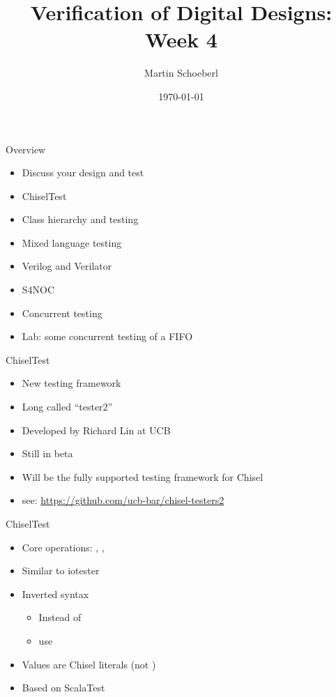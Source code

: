 

\newif\ifbook


\title{Verification of Digital Designs: Week 4}
\author{Martin Schoeberl}
\date{\today}



\begin{frame}
\titlepage
\end{frame}

\begin{frame}[fragile]{Overview}
\begin{itemize}
\item Discuss your design and test
\item ChiselTest
\item Class hierarchy and testing
\item Mixed language testing
\item Verilog and Verilator
\item S4NOC
\item Concurrent testing
\item Lab: some concurrent testing of a FIFO
\end{itemize}
\end{frame}

\begin{frame}[fragile]{ChiselTest}
\begin{itemize}
\item New testing framework
\item Long called ``tester2''
\item Developed by Richard Lin at UCB
\item Still in beta
\item Will be the fully supported testing framework for Chisel
\item see: \url{https://github.com/ucb-bar/chisel-testers2}
\end{itemize}
\end{frame}

\begin{frame}[fragile]{ChiselTest}
\begin{itemize}
\item Core operations: , , 
\item Similar to iotester
\item Inverted syntax
\begin{itemize}
\item Instead of 
\item use 
\end{itemize}
\item Values are Chisel literals (not )
\item Based on ScalaTest
\end{itemize}
\end{frame}




